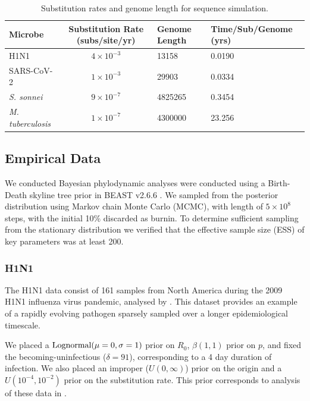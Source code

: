 \documentclass{article}
\begin{document}
\begin{spacing}{1.5}
\begin{table}[h!]
    \centering
    \caption{Substitution rates and genome length for sequence simulation.}
    \begin{tabular}{l|c|l|l}
    \hline
    Microbe                     &   Substitution Rate (subs/site/yr) & Genome Length & Time/Sub/Genome (yrs)  \\
    \hline
    H1N1                        & $4\times10^{-3}$ & 13158 & 0.0190\\
    SARS-CoV-2                  & $1\times10^{-3}$ & 29903 & 0.0334\\
    \textit{S. sonnei}    & $9\times10^{-7}$ & 4825265  & 0.3454\\
    \textit{M. tuberculosis}    &   $1\times10^{-7}$ & 4300000 & 23.256\\
    \hline
    \end{tabular}
    \label{tab:seq_parms}
\end{table}

\subsection*{Empirical Data}
We conducted Bayesian phylodynamic analyses were conducted using a Birth-Death skyline tree prior in BEAST v2.6.6 \citep{bouckaert_beast_2019}. We sampled from the posterior distribution using Markov chain Monte Carlo (MCMC), with length of $5\times10^{8}$ steps, with the initial 10\% discarded as burnin. To determine sufficient sampling from the stationary distribution we verified that the effective sample size (ESS) of key parameters was at least 200.

\subsubsection*{H1N1}
The H1N1 data consist of 161 samples from North America during the 2009 H1N1 influenza virus pandemic, analysed by \citet{hedge_2013_real-time}. This  dataset provides an example of a rapidly evolving pathogen sparsely sampled over a longer epidemiological timescale. 

We placed a $\textnormal{Lognormal}(\mu=0,\sigma=1)$ prior on $R_0$, $\beta(1,1)$ prior on $p$, and fixed the becoming-uninfectious ($\delta = 91$), corresponding to a 4 day duration of infection. We also placed an improper ($U(0,\infty)$) prior on the origin and a $U(10^{-4},10^{-2})$ prior on the substitution rate. This prior corresponds to analysis of these data in \citet{featherstone_decoding_2023}.


\end{spacing}
\end{document}
